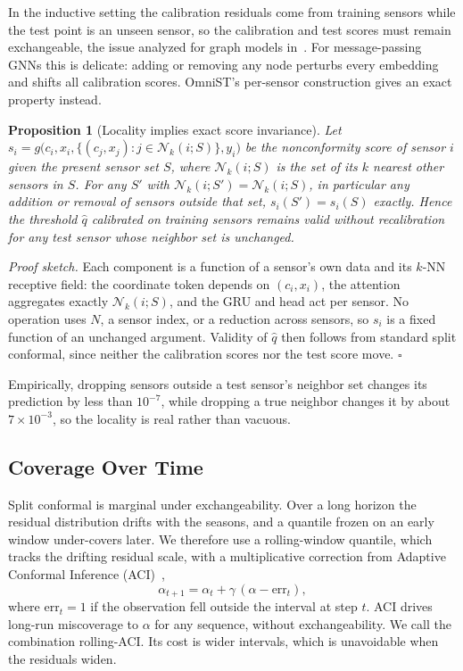 \documentclass[journal]{IEEEtran}
\newtheorem{proposition}{Proposition}
\begin{document}
In the inductive setting the calibration residuals come from training sensors while the test point
is an unseen sensor, so the calibration and test scores must remain exchangeable, the issue analyzed
for graph models in~\cite{conformalinductivegnn2024}. For message-passing GNNs this is delicate:
adding or removing any node perturbs every embedding and shifts all calibration scores. OmniST's
per-sensor construction gives an exact property instead.

\begin{proposition}[Locality implies exact score invariance]
\label{prop:locality}
Let $s_i = g\big(c_i, x_i, \{(c_j,x_j): j\in\mathcal{N}_k(i;S)\}, y_i\big)$ be the nonconformity
score of sensor $i$ given the present sensor set $S$, where $\mathcal{N}_k(i;S)$ is the set of its $k$
nearest other sensors in $S$. For any $S'$ with $\mathcal{N}_k(i;S') = \mathcal{N}_k(i;S)$, in
particular any addition or removal of sensors outside that set, $s_i(S') = s_i(S)$ exactly. Hence the
threshold $\hat q$ calibrated on training sensors remains valid without recalibration for any test
sensor whose neighbor set is unchanged.
\end{proposition}

\emph{Proof sketch.} Each component is a function of a sensor's own data and its $k$-NN receptive
field: the coordinate token depends on $(c_i,x_i)$, the attention aggregates exactly
$\mathcal{N}_k(i;S)$, and the GRU and head act per sensor. No operation uses $N$, a sensor index, or a
reduction across sensors, so $s_i$ is a fixed function of an unchanged argument. Validity of $\hat q$
then follows from standard split conformal, since neither the calibration scores nor the test score
move. $\square$

Empirically, dropping sensors outside a test sensor's neighbor set changes its prediction by less
than $10^{-7}$, while dropping a true neighbor changes it by about $7\times10^{-3}$, so the locality is
real rather than vacuous.

\subsection{Coverage Over Time}
\label{sec:online-conformal}

Split conformal is marginal under exchangeability. Over a long horizon the residual distribution
drifts with the seasons, and a quantile frozen on an early window under-covers later. We therefore
use a rolling-window quantile, which tracks the drifting residual scale, with a multiplicative
correction from Adaptive Conformal Inference (ACI)~\cite{gibbs2021aci},
\begin{equation}
\alpha_{t+1} = \alpha_t + \gamma\,(\alpha - \mathrm{err}_t),
\end{equation}
where $\mathrm{err}_t=1$ if the observation fell outside the interval at step $t$. ACI drives
long-run miscoverage to $\alpha$ for any sequence, without exchangeability. We call the combination
rolling-ACI. Its cost is wider intervals, which is unavoidable when the residuals widen.
\end{document}
